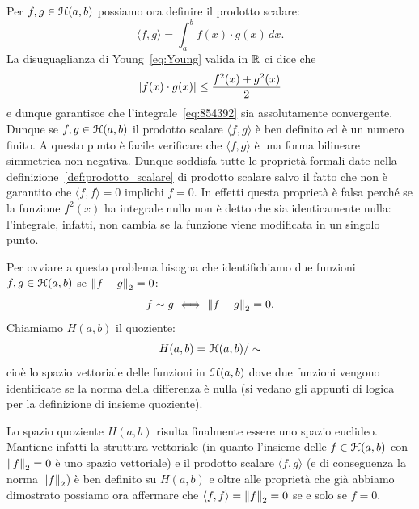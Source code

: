 Per $f,g\in \mathcal H(a,b)$ possiamo ora definire il prodotto scalare:
\begin{equation}\label{eq:854392}
  \langle f, g\rangle = \int_a^b f(x) \cdot g(x)\, dx.
\end{equation}
La disuguaglianza di
Young~\eqref{eq:Young} valida in $\mathbb R$ ci dice che
\[
  {\left|f(x) \cdot g(x)\right|} \le \frac{f^2(x)+g^2(x)}{2}
\]
e dunque garantisce che l'integrale~\eqref{eq:854392}
sia assolutamente convergente. Dunque se $f,g\in \mathcal H(a,b)$
il prodotto scalare $\langle f,g\rangle$ è ben definito ed
è un numero finito. A questo punto è facile verificare
che $\langle f,g\rangle$ è una forma bilineare simmetrica
non negativa. Dunque soddisfa tutte le proprietà formali
date nella definizione~\ref{def:prodotto_scalare} di prodotto scalare
salvo il fatto che non è garantito che $\langle f,f\rangle = 0$
implichi $f=0$. In effetti questa proprietà è falsa perché
se la funzione $f^2(x)$ ha integrale nullo non è detto che sia
identicamente nulla: l'integrale, infatti, non cambia
se la funzione viene modificata in un singolo punto.

Per ovviare a questo problema bisogna che identifichiamo due
funzioni $f,g\in \mathcal H(a,b)$ se ${\left\Vert f-g\right\Vert}_2=0$:
\[
  f \sim g  \iff {\left\Vert f-g\right\Vert}_2=0.
\]
Chiamiamo $H(a,b)$ il quoziente:
\[
  H(a,b) = \mathcal H(a,b)/\sim
\]
cioè lo spazio vettoriale delle funzioni in $\mathcal H(a,b)$ dove due funzioni
vengono identificate se la norma della differenza è nulla
(si vedano gli appunti di logica~\cite{appunti_logica}
per la definizione di insieme quoziente).

Lo spazio quoziente $H(a,b)$ risulta finalmente essere uno spazio
euclideo.
Mantiene infatti la struttura vettoriale (in quanto l'insieme
delle $f\in \mathcal H(a,b)$ con ${\left\Vert f\right\Vert}_2=0$
è uno spazio vettoriale)
e il prodotto scalare $\langle f,g\rangle$ (e di conseguenza la norma ${\left\Vert f\right\Vert}_2$)
è ben definito su $H(a,b)$ e oltre alle proprietà che già abbiamo dimostrato
possiamo ora affermare che $\langle f,f\rangle = {\left\Vert f\right\Vert}_2=0$ se e solo se $f=0$.

